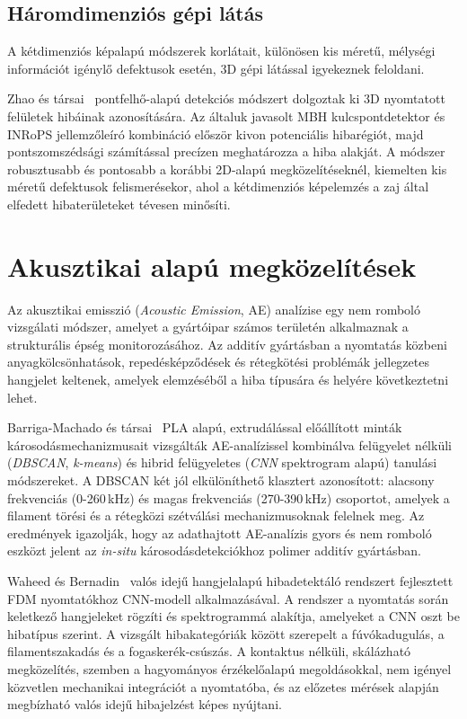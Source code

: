     \subsection{Háromdimenziós gépi látás}

    A kétdimenziós képalapú módszerek korlátait, különösen kis méretű, mélységi információt
    igénylő defektusok esetén, 3D gépi látással igyekeznek feloldani.

    Zhao és társai~\cite{zhao2023geometric} pontfelhő-alapú detekciós módszert dolgoztak ki 3D
    nyomtatott felületek hibáinak azonosítására. Az általuk javasolt MBH kulcspontdetektor és INRoPS
    jellemzőleíró kombináció először kivon potenciális hibarégiót, majd pontszomszédsági számítással
    precízen meghatározza a hiba alakját. A módszer robusztusabb és pontosabb a korábbi 2D-alapú
    megközelítéseknél, kiemelten kis méretű defektusok felismerésekor, ahol a kétdimenziós
    képelemzés a zaj által elfedett hibaterületeket tévesen minősíti.

\section{Akusztikai alapú megközelítések}

Az akusztikai emisszió (\textit{Acoustic Emission}, AE) analízise egy nem romboló vizsgálati módszer,
amelyet a gyártóipar számos területén alkalmaznak a strukturális épség monitorozásához. Az
additív gyártásban a nyomtatás közbeni anyagkölcsönhatások, repedésképződések és rétegkötési
problémák jellegzetes hangjelet keltenek, amelyek elemzéséből a hiba típusára és helyére
következtetni lehet.

Barriga-Machado és társai~\cite{barriga2025acoustic} PLA alapú, extrudálással előállított minták
károsodásmechanizmusait vizsgálták AE-analízissel kombinálva felügyelet nélküli (\textit{DBSCAN},
\textit{k-means}) és hibrid felügyeletes (\textit{CNN} spektrogram alapú) tanulási módszereket.
A DBSCAN két jól elkülöníthető klasztert azonosított: alacsony frekvenciás (0-260\,kHz) és magas
frekvenciás (270-390\,kHz) csoportot, amelyek a filament törési és a rétegközi szétválási
mechanizmusoknak felelnek meg. Az eredmények igazolják, hogy az adathajtott AE-analízis gyors és
nem romboló eszközt jelent az \textit{in-situ} károsodásdetekciókhoz polimer additív gyártásban.

Waheed és Bernadin~\cite{waheed2025acoustic} valós idejű hangjelalapú hibadetektáló rendszert
fejlesztett FDM nyomtatókhoz CNN-modell alkalmazásával. A rendszer a nyomtatás során keletkező
hangjeleket rögzíti és spektrogrammá alakítja, amelyeket a CNN oszt be hibatípus szerint.
A vizsgált hibakategóriák között szerepelt a fúvókadugulás, a filamentszakadás és a fogaskerék-csúszás.
A kontaktus nélküli, skálázható megközelítés, szemben a hagyományos érzékelőalapú megoldásokkal,
nem igényel közvetlen mechanikai integrációt a nyomtatóba, és az előzetes mérések alapján
megbízható valós idejű hibajelzést képes nyújtani.


